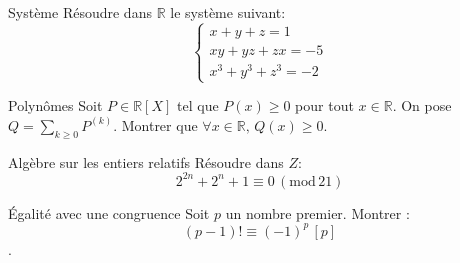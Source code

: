 \documentclass[french, a4paper, 11pt]{article}
\newcommand{\R}{\mathbb{R}}   %
\newcommand{\co}{\left[}         %
\newcommand{\cf}{\right]}        %
\newcommand{\cof}[1]{\co #1 \cf} %
\begin{document}
\begin{cadre}{Système}
  Résoudre dans \(\R\) le système suivant:
  \[\begin{cases}
      x+y+z = 1\\
      xy + yz + zx = -5\\
      x^{3}+y^{3}+z^{3} = -2
  \end{cases}\]
\end{cadre}

\begin{cadre}{Polynômes}
  Soit \(P\in\R\cof{X}\) tel que \(P(x)\geqslant 0\) pour tout \(x\in\R\). On pose \(Q = \sum_{k\geqslant 0}P^{(k)}\).
  Montrer que \(\forall x \in\R,\,Q(x)\geqslant 0\).
\end{cadre}

\begin{cadre}{Algèbre sur les entiers relatifs}
  Résoudre dans \(Z\):
    \[2^{2n}+2^n+1 \equiv 0 \, (\mathrm{mod}{\, 21})\]
\end{cadre}

\begin{cadre}{Égalité avec une congruence}
  Soit \(p\) un nombre premier. Montrer :
    \[(p-1)! \equiv (-1)^p \, \cof{p}\].
\end{cadre}
\end{document}
